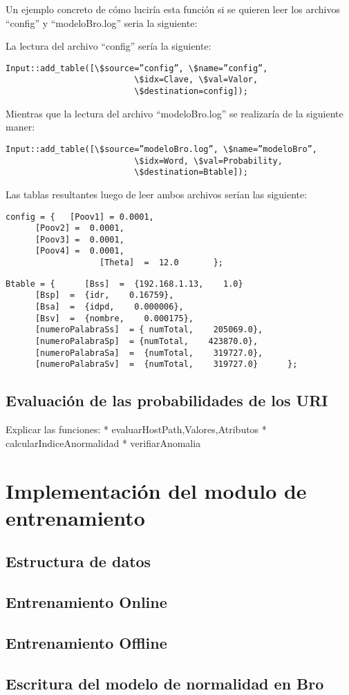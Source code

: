 Un ejemplo concreto de cómo luciría esta función si se quieren leer los archivos “config” y “modeloBro.log” seria la siguiente:

La lectura del archivo “config” sería la siguiente:

\begin{verbatim}
Input::add_table([\$source=”config”, \$name=”config”,
                          \$idx=Clave, \$val=Valor,
                          \$destination=config]);
\end{verbatim}                    

Mientras que la lectura del archivo “modeloBro.log” se realizaría de la siguiente maner:

\begin{verbatim}
Input::add_table([\$source=”modeloBro.log”, \$name=”modeloBro”,
                          \$idx=Word, \$val=Probability,
                          \$destination=Btable]);
\end{verbatim}

Las tablas resultantes luego de leer ambos archivos serían las siguiente:

\begin{verbatim}
config = {   [Poov1] = 0.0001,
      [Poov2] =  0.0001,
      [Poov3] =  0.0001,
      [Poov4] =  0.0001,
                   [Theta]  =  12.0       };
\end{verbatim}

\begin{verbatim}
Btable = {      [Bss]  =  {192.168.1.13,    1.0}
      [Bsp]  =  {idr,    0.16759},
      [Bsa]  =  {idpd,    0.000006},
      [Bsv]  =  {nombre,    0.000175},
      [numeroPalabraSs]  = { numTotal,    205069.0},
      [numeroPalabraSp]  = {numTotal,    423870.0},
      [numeroPalabraSa]  =  {numTotal,    319727.0},
      [numeroPalabraSv]  =  {numTotal,    319727.0}      };
\end{verbatim}


\subsection{Evaluación de las probabilidades de los URI}
Explicar las funciones:
* evaluar{HostPath,Valores,Atributos}
* calcularIndiceAnormalidad
* verifiarAnomalia
\section{Implementación del modulo de entrenamiento}
\subsection{Estructura de datos}
\subsection{Entrenamiento Online}
\subsection{Entrenamiento Offline}
\subsection{Escritura del modelo de normalidad en Bro}